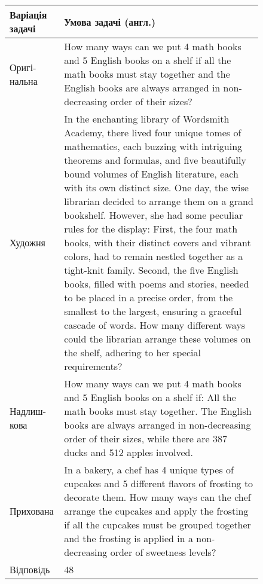 \begin{figure}[h!]
\centering
\small
{}
\label{tab:problem_example_3921}
\begin{tabular}{|p{2cm}|p{14cm}|}
    \hline
    \textbf{Варіація задачі} & \textbf{Умова задачі (англ.)} \\
    \hline
    Оригі-нальна & How many ways can we put 4 math books and 5 English books on a shelf if all the math books must stay together and the English books are always arranged in non-decreasing order of their sizes? \\ \hline
    Художня & In the enchanting library of Wordsmith Academy, there lived four unique tomes of mathematics, each buzzing with intriguing theorems and formulas, and five beautifully bound volumes of English literature, each with its own distinct size. One day, the wise librarian decided to arrange them on a grand bookshelf. However, she had some peculiar rules for the display: First, the four math books, with their distinct covers and vibrant colors, had to remain nestled together as a tight-knit family. Second, the five English books, filled with poems and stories, needed to be placed in a precise order, from the smallest to the largest, ensuring a graceful cascade of words. How many different ways could the librarian arrange these volumes on the shelf, adhering to her special requirements? \\ \hline
    Надлиш-кова & How many ways can we put 4 math books and 5 English books on a shelf if: All the math books must stay together. The English books are always arranged in non-decreasing order of their sizes, while there are 387 ducks and 512 apples involved. \\ \hline
    Прихована & In a bakery, a chef has 4 unique types of cupcakes and 5 different flavors of frosting to decorate them. How many ways can the chef arrange the cupcakes and apply the frosting if all the cupcakes must be grouped together and the frosting is applied in a non-decreasing order of sweetness levels? \\ \hline
    Відповідь & 48 \\ \hline
\end{tabular}
\end{figure}

